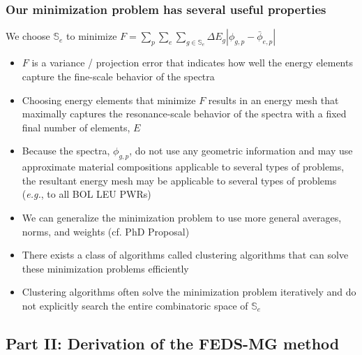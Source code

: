 \documentclass[compress,10pt]{beamer}
\newcommand{\eg}{{\it e.g.}}
\begin{document}
\typeout{***********************************************************************************}

\begin{frame}
   \frametitle{Our minimization problem has several useful properties}

   \begin{block}{We choose $\mathbb{S}_e$ to minimize $F = \sum\limits_{p} \sum\limits_{e} \sum\limits_{g \in \mathbb{S}_e} \Delta E_g | \phi_{g,p} - \bar{\phi}_{e,p} | $}
   \begin{itemize}
       \item<1-> $F$ is a variance / projection error that indicates how well the energy elements capture the fine-scale behavior of the spectra
       \item<2-> Choosing energy elements that minimize $F$ results in an energy mesh that maximally captures the resonance-scale behavior of the spectra with a fixed final number of elements, $E$
       \item<3-> Because the spectra, $\phi_{g,p}$, do not use any geometric information and may use approximate material compositions applicable to several types of problems, the resultant energy mesh may be applicable to several types of problems (\eg, to all BOL LEU PWRs)
       \item<4-> We can generalize the minimization problem to use more general averages, norms, and weights (cf. PhD Proposal)
       \item<5-> There exists a class of algorithms called clustering algorithms that can solve these minimization problems efficiently
       \item<6-> Clustering algorithms often solve the minimization problem iteratively and do not explicitly search the entire combinatoric space of $\mathbb{S}_e$
   \end{itemize}
   \end{block}

\end{frame}

\subsection{Part II: Derivation of the FEDS-MG method}
\end{document}
